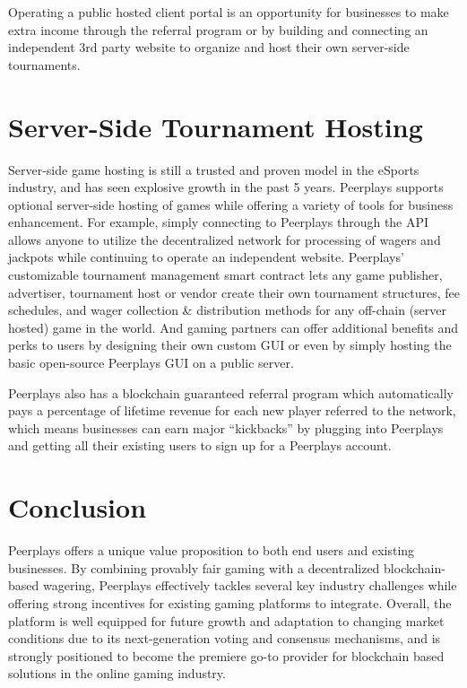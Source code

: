 \documentclass[a4paper,titlepage,final]{article}
\begin{document}
Operating a public hosted client portal is an opportunity for businesses to make extra income through the referral program or by building and connecting an independent 3rd party website to organize and host their own server-side tournaments.

\section{Server-Side Tournament Hosting}

Server-side game hosting is still a trusted and proven model in the eSports industry, and has seen explosive growth in the past 5 years. Peerplays supports optional server-side hosting of games while offering a variety of tools for business enhancement. For example, simply connecting to Peerplays through the API allows anyone to utilize the decentralized network for processing of wagers and jackpots while continuing to operate an independent website. Peerplays’ customizable tournament management smart contract lets any game publisher, advertiser, tournament host or vendor create their own tournament structures, fee schedules, and wager collection & distribution methods for any off-chain (server hosted) game in the world. And gaming partners can offer additional benefits and perks to users by designing their own custom GUI or even by simply hosting the basic open-source Peerplays GUI on a public server. 

Peerplays also has a blockchain guaranteed referral program which automatically pays a percentage of lifetime revenue for each new player referred to the network, which means businesses can earn major “kickbacks” by plugging into Peerplays and getting all their existing users to sign up for a Peerplays account.

\section{Conclusion}

Peerplays offers a unique value proposition to both end users and existing businesses. By combining provably fair gaming with a decentralized blockchain-based wagering, Peerplays effectively tackles several key industry challenges while offering strong incentives for existing gaming platforms to integrate. Overall, the platform is well equipped for future growth and adaptation to changing market conditions due to its next-generation voting and consensus mechanisms, and is strongly positioned to become the premiere go-to provider for blockchain based solutions in the online gaming industry.
\end{document}
